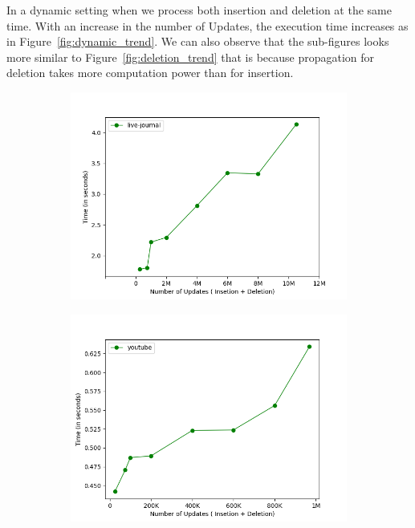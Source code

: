 \documentclass[a4paper]{article}
\begin{document}
In a dynamic setting when we process both insertion and deletion at the same time. With an increase in the number of Updates, the execution time increases as in Figure~\ref{fig:dynamic_trend}. We can also observe that the sub-figures looks more similar to Figure~\ref{fig:deletion_trend} that is because propagation for deletion takes more computation power than for insertion.
\begin{figure}[H]
    \centering
    \begin{subfigure}[b]{0.45\textwidth}
         \centering
         \includegraphics[width=\textwidth]{img/dyn/u1.png}
         \caption{}
         \label{fig:dynamic_trend_1}
    \end{subfigure}
    \hfill
    \begin{subfigure}[b]{0.45\textwidth}
         \centering
         \includegraphics[width=\textwidth]{img/dyn/u2.png}

\end{subfigure}
\end{figure}
\end{document}
